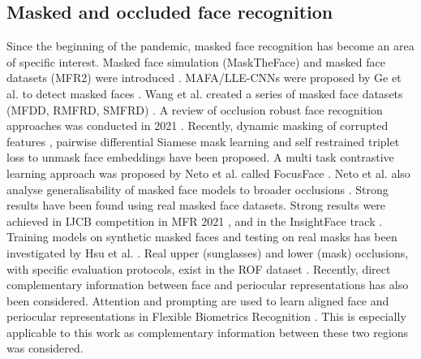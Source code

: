 \documentclass[10pt,lettersize,journal]{IEEEtran}
\begin{document}
\subsection{Masked and occluded face recognition}
Since the beginning of the pandemic, masked face recognition has become an area of specific interest. Masked face simulation (MaskTheFace) and masked face datasets (MFR2) were introduced \cite{mfr2}. MAFA/LLE-CNNs were proposed by Ge et al. to detect masked faces \cite{llecnn}. Wang et al. created a series of masked face datasets (MFDD, RMFRD, SMFRD) \cite{rmfrd}. A review of occlusion robust face recognition approaches was conducted in 2021 \cite{surveyocc}. Recently, dynamic masking of corrupted features \cite{from2022}, pairwise differential Siamese mask learning \cite{masklearn} and self restrained triplet loss to unmask face embeddings \cite{umr} have been proposed. A multi task contrastive learning approach was proposed by Neto et al. called FocusFace \cite{focusface}. Neto et al. also analyse generalisability of masked face models to broader occlusions \cite{beyondmasks}. Strong results have been found using real masked face datasets. Strong results were achieved in IJCB competition in MFR 2021 \cite{mfr2021}, and in the InsightFace track \cite{insightfacemfr}. Training models on synthetic masked faces and testing on real masks has been investigated by Hsu et al. \cite{hsu2022}. Real upper (sunglasses) and lower (mask) occlusions, with specific evaluation protocols, exist in the ROF dataset \cite{rof}. Recently, direct complementary information between face and periocular representations has also been considered. Attention and prompting are used to learn aligned face and periocular representations in Flexible Biometrics Recognition \cite{fbr2024}. This is especially applicable to this work as complementary information between these two regions was considered.\par
\end{document}

